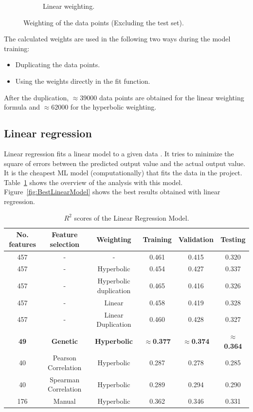 \documentclass[11pt]{article}
\begin{document}
\begin{figure}
\begin{subfigure}[b]{0.45\textwidth}
        \caption{Linear weighting.}
        \label{fig:linearweightdistribution}
     \end{subfigure}
     \caption{Weighting of the data points (Excluding the test set).}
     \label{fig:WeightDistribution}
\end{figure}

The calculated weights are used in the following two ways during the model training:

\begin{itemize}
\item Duplicating the data points.
\item Using the weights directly in the fit function.
\end{itemize}

After the duplication, $\approx 39000$ data points are obtained for the linear weighting formula and $\approx 62000$ for the hyperbolic weighting.

\subsection{Linear regression}
Linear regression fits a linear model to a given data \cite{linearregressionreview}.
It tries to minimize the square of errors between the predicted output value and the actual output value.
It is the cheapest ML model (computationally) that fits the data in the project.
Table~\ref{table:1} shows the overview of the analysis with this model.
Figure~\ref{fig:BestLinearModel} shows the best results obtained with linear regression.

\begin{table} [h!]
\centering
\resizebox{\linewidth}{!} {
\begin{tabular}{ | c | c | c | c | c | c | }
\hline
\textbf{No.  features} & \textbf{Feature selection} & \textbf{Weighting} & \textbf{Training} & \textbf{Validation} & \textbf{Testing} \\ [0.5 ex]
\hline \hline
457 & - & - & 0.461 & 0.415 & 0.320\\
457 &  - & Hyperbolic & 0.454 & 0.427 & 0.337\\
457 & - & Hyperbolic duplication & 0.465 & 0.416 & 0.326\\
457 & - & Linear & 0.458 & 0.419 & 0.328\\
457 & - & Linear Duplication & 0.460 & 0.428 & 0.327\\
\textbf{49} & \textbf{Genetic}\footnotemark[1] & \textbf{Hyperbolic} & \textbf{$\approx$0.377} & \textbf{$\approx$0.374}  & \textbf{$\approx$0.364}\\
40 & Pearson Correlation & Hyperbolic & 0.287 & 0.278  & 0.285 \\ 
40 & Spearman Correlation & Hyperbolic & 0.289 & 0.294  & 0.290 \\ 
176 & Manual & Hyperbolic & 0.362  & 0.346  & 0.331\\ [1ex]
\hline
\end{tabular}
}
\caption{$R^2$ scores of the Linear Regression Model.}
\label {table:1}
\end{table}
\end{document}
